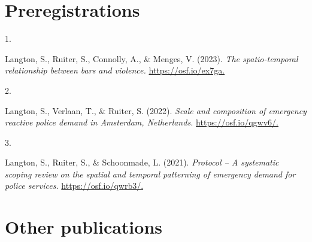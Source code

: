 \documentclass[10pt,a4paper,]{article}
\newlength{\cslhangindent}
\newlength{\csllabelwidth}
\newenvironment{CSLReferences}[2] %
 {\begin{list}{}{%
  \setlength{\itemindent}{0pt}
  \setlength{\leftmargin}{0pt}
  \setlength{\parsep}{0pt}
  \ifodd #1
   \setlength{\leftmargin}{\cslhangindent}
   \setlength{\itemindent}{-1\cslhangindent}
  \fi
  \setlength{\itemsep}{#2\baselineskip}}}
 {\end{list}}
\newcommand{\CSLLeftMargin}[1]{\parbox[t]{\csllabelwidth}{\strut#1\strut}}
\newcommand{\CSLRightInline}[1]{\parbox[t]{\linewidth - \csllabelwidth}{\strut#1\strut}}
\begin{document}
\hypertarget{preregistrations}{%
\section{Preregistrations}\label{preregistrations}}

\hypertarget{refs-ce11f0318060747a43ec297f7d71c55d}{}
\begin{CSLReferences}{0}{0}
\leavevmode{}%
\CSLLeftMargin{1. }%
\CSLRightInline{Langton, S., Ruiter, S., Connolly, A., \& Menges, V.
(2023). \emph{The spatio-temporal relationship between bars and
violence.} \url{https://osf.io/ex7ga.}}

\leavevmode{}%
\CSLLeftMargin{2. }%
\CSLRightInline{Langton, S., Verlaan, T., \& Ruiter, S. (2022).
\emph{Scale and composition of emergency reactive police demand in
Amsterdam, Netherlands.} \url{https://osf.io/qgwv6/.}}

\leavevmode{}%
\CSLLeftMargin{3. }%
\CSLRightInline{Langton, S., Ruiter, S., \& Schoonmade, L. (2021).
\emph{Protocol -- A systematic scoping review on the spatial and
temporal patterning of emergency demand for police services.}
\url{https://osf.io/qwrb3/.}}

\end{CSLReferences}

\hypertarget{other-publications}{%
\section{Other publications}\label{other-publications}}
\end{document}
